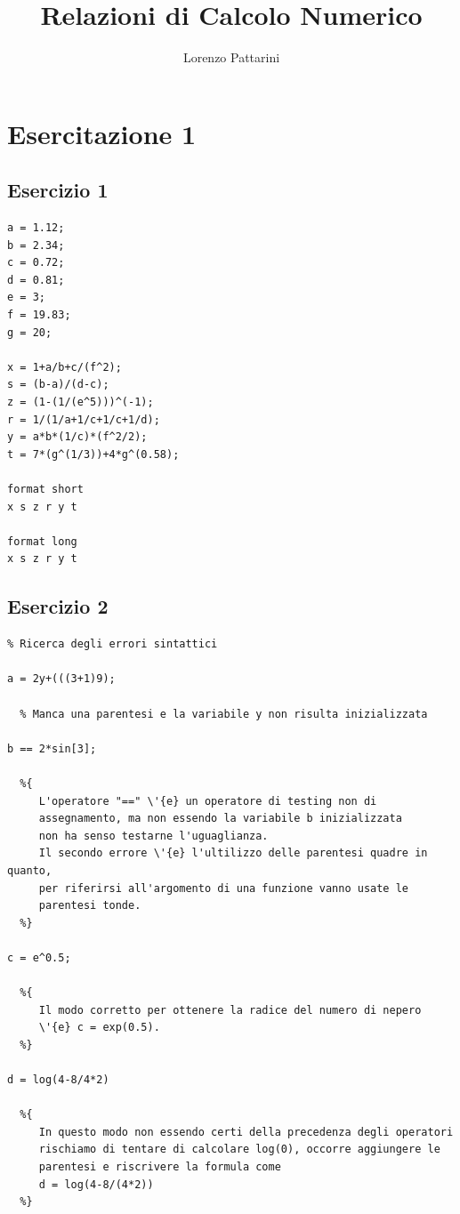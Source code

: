 \documentclass{article}
\newcommand{\vs}{\vspace*{1.0cm}}
\begin{document}
  \author{Lorenzo Pattarini}
  \title{Relazioni di Calcolo Numerico}
  \maketitle
 

  \tableofcontents



\newpage
\section{ Esercitazione 1}



\subsection{ Esercizio 1}
\begin{lstlisting}
a = 1.12;
b = 2.34;
c = 0.72;
d = 0.81;
e = 3;
f = 19.83;
g = 20;

x = 1+a/b+c/(f^2);
s = (b-a)/(d-c);
z = (1-(1/(e^5)))^(-1);
r = 1/(1/a+1/c+1/c+1/d);
y = a*b*(1/c)*(f^2/2);
t = 7*(g^(1/3))+4*g^(0.58);

format short
x s z r y t

format long
x s z r y t

\end{lstlisting}


\vs
\subsection{ Esercizio 2}
\begin{lstlisting}
% Ricerca degli errori sintattici

a = 2y+(((3+1)9);

  % Manca una parentesi e la variabile y non risulta inizializzata

b == 2*sin[3];

  %{
     L'operatore "==" \'{e} un operatore di testing non di 
     assegnamento, ma non essendo la variabile b inizializzata
     non ha senso testarne l'uguaglianza.
     Il secondo errore \'{e} l'ultilizzo delle parentesi quadre in quanto, 
     per riferirsi all'argomento di una funzione vanno usate le
     parentesi tonde.
  %} 

c = e^0.5;

  %{
     Il modo corretto per ottenere la radice del numero di nepero
     \'{e} c = exp(0.5).
  %}

d = log(4-8/4*2)

  %{
     In questo modo non essendo certi della precedenza degli operatori
     rischiamo di tentare di calcolare log(0), occorre aggiungere le
     parentesi e riscrivere la formula come
     d = log(4-8/(4*2)) 
  %}

\end{lstlisting}
\end{document}
